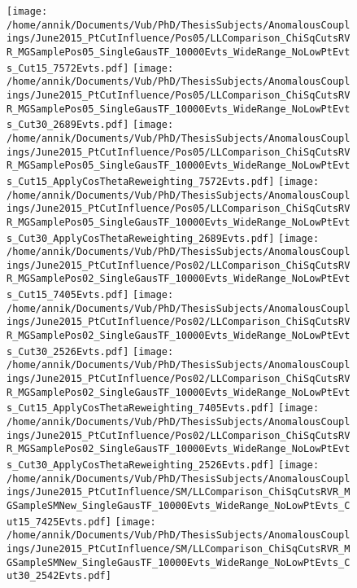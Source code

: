 \begin{figure}[h!t]
 \centering
 \texttt{[image: /home/annik/Documents/Vub/PhD/ThesisSubjects/AnomalousCouplings/June2015\_PtCutInfluence/Pos05/LLComparison\_ChiSqCutsRVR\_MGSamplePos05\_SingleGausTF\_10000Evts\_WideRange\_NoLowPtEvts\_Cut15\_7572Evts.pdf]}
 \texttt{[image: /home/annik/Documents/Vub/PhD/ThesisSubjects/AnomalousCouplings/June2015\_PtCutInfluence/Pos05/LLComparison\_ChiSqCutsRVR\_MGSamplePos05\_SingleGausTF\_10000Evts\_WideRange\_NoLowPtEvts\_Cut30\_2689Evts.pdf]}
 \texttt{[image: /home/annik/Documents/Vub/PhD/ThesisSubjects/AnomalousCouplings/June2015\_PtCutInfluence/Pos05/LLComparison\_ChiSqCutsRVR\_MGSamplePos05\_SingleGausTF\_10000Evts\_WideRange\_NoLowPtEvts\_Cut15\_ApplyCosThetaReweighting\_7572Evts.pdf]}
 \texttt{[image: /home/annik/Documents/Vub/PhD/ThesisSubjects/AnomalousCouplings/June2015\_PtCutInfluence/Pos05/LLComparison\_ChiSqCutsRVR\_MGSamplePos05\_SingleGausTF\_10000Evts\_WideRange\_NoLowPtEvts\_Cut30\_ApplyCosThetaReweighting\_2689Evts.pdf]}
 \texttt{[image: /home/annik/Documents/Vub/PhD/ThesisSubjects/AnomalousCouplings/June2015\_PtCutInfluence/Pos02/LLComparison\_ChiSqCutsRVR\_MGSamplePos02\_SingleGausTF\_10000Evts\_WideRange\_NoLowPtEvts\_Cut15\_7405Evts.pdf]}
 \texttt{[image: /home/annik/Documents/Vub/PhD/ThesisSubjects/AnomalousCouplings/June2015\_PtCutInfluence/Pos02/LLComparison\_ChiSqCutsRVR\_MGSamplePos02\_SingleGausTF\_10000Evts\_WideRange\_NoLowPtEvts\_Cut30\_2526Evts.pdf]}
 \texttt{[image: /home/annik/Documents/Vub/PhD/ThesisSubjects/AnomalousCouplings/June2015\_PtCutInfluence/Pos02/LLComparison\_ChiSqCutsRVR\_MGSamplePos02\_SingleGausTF\_10000Evts\_WideRange\_NoLowPtEvts\_Cut15\_ApplyCosThetaReweighting\_7405Evts.pdf]}
 \texttt{[image: /home/annik/Documents/Vub/PhD/ThesisSubjects/AnomalousCouplings/June2015\_PtCutInfluence/Pos02/LLComparison\_ChiSqCutsRVR\_MGSamplePos02\_SingleGausTF\_10000Evts\_WideRange\_NoLowPtEvts\_Cut30\_ApplyCosThetaReweighting\_2526Evts.pdf]}
 \texttt{[image: /home/annik/Documents/Vub/PhD/ThesisSubjects/AnomalousCouplings/June2015\_PtCutInfluence/SM/LLComparison\_ChiSqCutsRVR\_MGSampleSMNew\_SingleGausTF\_10000Evts\_WideRange\_NoLowPtEvts\_Cut15\_7425Evts.pdf]}
 \texttt{[image: /home/annik/Documents/Vub/PhD/ThesisSubjects/AnomalousCouplings/June2015\_PtCutInfluence/SM/LLComparison\_ChiSqCutsRVR\_MGSampleSMNew\_SingleGausTF\_10000Evts\_WideRange\_NoLowPtEvts\_Cut30\_2542Evts.pdf]}

\end{figure}
